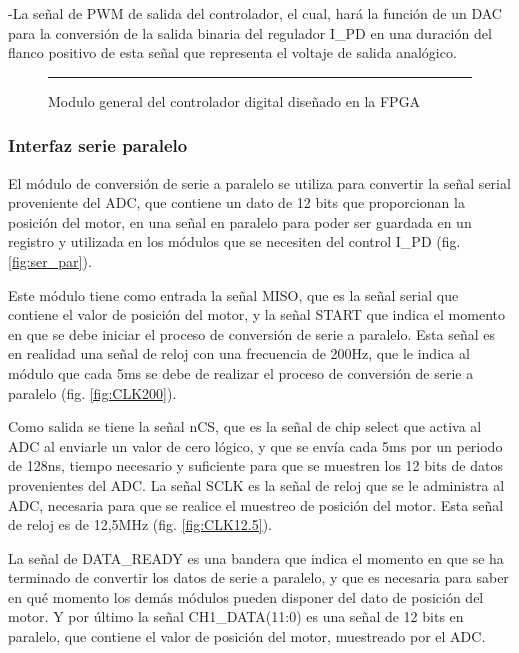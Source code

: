 \documentclass[12pt,a4paper]{article} %
\begin{document}
-La señal de PWM de salida del controlador, el cual, hará la función de un DAC para la conversión de la salida binaria del regulador I\_PD en una duración del flanco positivo de esta señal que representa el voltaje de salida analógico.

\begin{figure}[htbp]
  \centering
    \rule{35em}{0.3pt}
  \caption[CAS2im]{Modulo general del controlador digital diseñado en la FPGA}
  \label{fig:ModGen}
\end{figure}

\subsubsection{Interfaz serie paralelo}

El módulo de conversión de serie a paralelo se utiliza para convertir la señal serial proveniente del ADC, que contiene un dato de 12 bits que proporcionan la posición del motor, en una señal en paralelo para poder ser guardada en un registro y utilizada en los módulos que se necesiten del control I\_PD (fig. \ref{fig:ser_par}).

Este módulo tiene como entrada la señal MISO, que es la señal serial que contiene el valor de posición del motor, y la señal START que indica el momento en que se debe iniciar el proceso de conversión de serie a paralelo. Esta señal es en realidad una señal de reloj con una frecuencia de 200Hz, que le indica al módulo que cada 5ms se debe de realizar el proceso de conversión de serie a paralelo (fig. \ref{fig:CLK200}). 

Como salida se tiene la señal nCS, que es la señal de chip select que activa al ADC al enviarle un valor de cero lógico, y que se envía cada 5ms por un periodo de 128ns, tiempo necesario y suficiente para que se muestren los 12 bits de datos provenientes del ADC. La señal SCLK es la señal de reloj que se le administra al ADC, necesaria para que se realice el muestreo de posición del motor. Esta señal de reloj es de 12,5MHz (fig. \ref{fig:CLK12.5}). 

La señal de DATA\_READY es una bandera que indica el momento en que se ha terminado de convertir los datos de serie a paralelo, y que es necesaria para saber en qué momento los demás módulos pueden disponer del dato de posición del motor. Y por último la señal CH1\_DATA(11:0) es  una señal de 12 bits en paralelo, que contiene el valor de posición del motor, muestreado por el ADC.
\end{document}
